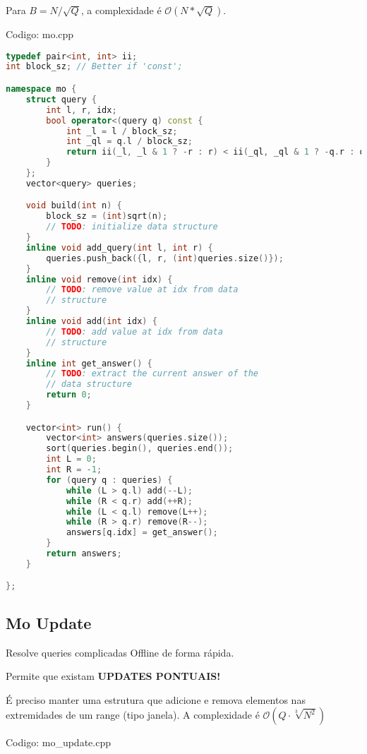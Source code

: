 \documentclass[10pt, a4paper, oneside]{book}
\begin{document}
Para $B = N / \sqrt Q$, a complexidade é $\mathcal{O}(N * \sqrt{Q})$.

\hfill

Codigo: mo.cpp

\begin{lstlisting}[language=C++]
typedef pair<int, int> ii;
int block_sz; // Better if 'const';

namespace mo {
    struct query {
        int l, r, idx;
        bool operator<(query q) const {
            int _l = l / block_sz;
            int _ql = q.l / block_sz;
            return ii(_l, _l & 1 ? -r : r) < ii(_ql, _ql & 1 ? -q.r : q.r);
        }
    };
    vector<query> queries;

    void build(int n) {
        block_sz = (int)sqrt(n);
        // TODO: initialize data structure
    }
    inline void add_query(int l, int r) {
        queries.push_back({l, r, (int)queries.size()});
    }
    inline void remove(int idx) {
        // TODO: remove value at idx from data
        // structure
    }
    inline void add(int idx) {
        // TODO: add value at idx from data
        // structure
    }
    inline int get_answer() {
        // TODO: extract the current answer of the
        // data structure
        return 0;
    }

    vector<int> run() {
        vector<int> answers(queries.size());
        sort(queries.begin(), queries.end());
        int L = 0;
        int R = -1;
        for (query q : queries) {
            while (L > q.l) add(--L);
            while (R < q.r) add(++R);
            while (L < q.l) remove(L++);
            while (R > q.r) remove(R--);
            answers[q.idx] = get_answer();
        }
        return answers;
    }

};
\end{lstlisting}
\hfill

\subsection{Mo Update}


Resolve queries complicadas Offline de forma rápida.   



Permite que existam \textbf{UPDATES PONTUAIS!}  

É preciso manter uma estrutura que adicione e remova elementos nas extremidades de um range (tipo janela). A complexidade é $\mathcal{O}(Q \cdot \sqrt[3]{N^2})$

\hfill

Codigo: mo\_update.cpp
\end{document}
